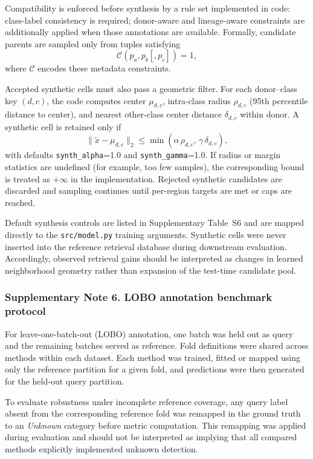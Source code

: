\documentclass[11pt]{article}
\begin{document}
Compatibility is enforced before synthesis by a rule set implemented in code: class-label consistency is required; donor-aware and lineage-aware constraints are additionally applied when those annotations are available. Formally, candidate parents are sampled only from tuples satisfying
\[
\mathcal{C}(p_a,p_b[,p_c])=1,
\]
where $\mathcal{C}$ encodes these metadata constraints.

Accepted synthetic cells must also pass a geometric filter. For each donor--class key $(d,c)$, the code computes center $\mu_{d,c}$, intra-class radius $\rho_{d,c}$ (95th percentile distance to center), and nearest other-class center distance $\delta_{d,c}$ within donor. A synthetic cell is retained only if
\[
\|\tilde{x}-\mu_{d,c}\|_2 \le \min(\alpha\,\rho_{d,c},\,\gamma\,\delta_{d,c}),
\]
with defaults \texttt{synth\_alpha}=1.0 and \texttt{synth\_gamma}=1.0. If radius or margin statistics are undefined (for example, too few samples), the corresponding bound is treated as $+\infty$ in the implementation. Rejected synthetic candidates are discarded and sampling continues until per-region targets are met or caps are reached.

Default synthesis controls are listed in Supplementary Table~S6 and are mapped directly to the \texttt{src/model.py} training arguments. Synthetic cells were never inserted into the reference retrieval database during downstream evaluation. Accordingly, observed retrieval gains should be interpreted as changes in learned neighborhood geometry rather than expansion of the test-time candidate pool.

\subsubsection*{Supplementary Note 6. LOBO annotation benchmark protocol}

For leave-one-batch-out (LOBO) annotation, one batch was held out as query and the remaining batches served as reference. Fold definitions were shared across methods within each dataset. Each method was trained, fitted or mapped using only the reference partition for a given fold, and predictions were then generated for the held-out query partition.

To evaluate robustness under incomplete reference coverage, any query label absent from the corresponding reference fold was remapped in the ground truth to an \textit{Unknown} category before metric computation. This remapping was applied during evaluation and should not be interpreted as implying that all compared methods explicitly implemented unknown detection.
\end{document}
